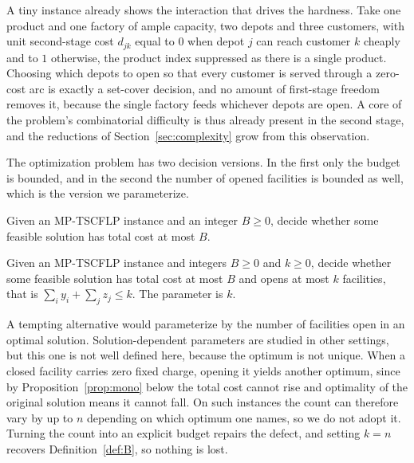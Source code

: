 

A tiny instance already shows the interaction that drives the hardness.
Take one product and one factory of ample capacity, two depots and three
customers, with unit second-stage cost $d_{jk}$ equal to $0$ when depot
$j$ can reach customer $k$ cheaply and to $1$ otherwise, the product
index suppressed as there is a single product. Choosing which
depots to open so that every customer is served through a zero-cost arc
is exactly a set-cover decision, and no amount of first-stage freedom
removes it, because the single factory feeds whichever depots are open.
A core of the problem's combinatorial difficulty is thus already present
in the second stage, and the reductions of Section~\ref{sec:complexity}
grow from this observation.

The optimization problem has two decision versions. In the first only the
budget is bounded, and in the second the number of opened facilities is
bounded as well, which is the version we parameterize.

\begin{definition}\label{def:B}
Given an MP-TSCFLP instance and an integer $B\ge 0$, decide whether some
feasible solution has total cost at most $B$.
\end{definition}

\begin{definition}\label{def:Bk}
Given an MP-TSCFLP instance and integers $B\ge 0$ and $k\ge 0$, decide
whether some feasible solution has total cost at most $B$ and opens at
most $k$ facilities, that is $\sum_{i}y_i+\sum_{j}z_j\le k$. The
parameter is $k$.
\end{definition}

A tempting alternative would parameterize by the number of facilities
open in an optimal solution. Solution-dependent parameters are studied
in other settings, but this one is not well defined here, because the
optimum is not unique.
When a closed facility carries zero fixed charge, opening it yields
another optimum, since by Proposition~\ref{prop:mono} below the total
cost cannot rise and optimality of the original solution means it cannot
fall. On such instances the count can therefore
vary by up to $n$ depending on which optimum one names, so we do not
adopt it. Turning the count into an explicit
budget repairs the defect, and setting $k=n$ recovers
Definition~\ref{def:B}, so nothing is lost.


